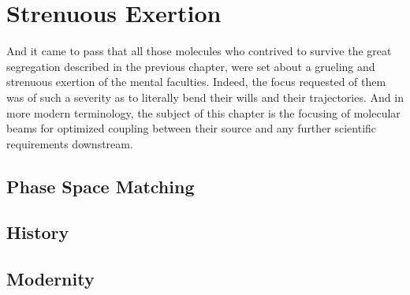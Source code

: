 \chapter{Strenuous Exertion}

And it came to pass that all those molecules who contrived to survive the great segregation described in the previous chapter, were set about a grueling and strenuous exertion of the mental faculties. Indeed, the focus requested of them was of such a severity as to literally bend their wills and their trajectories. And in more modern terminology, the subject of this chapter is the focusing of molecular beams for optimized coupling between their source and any further scientific requirements downstream.

\section{Phase Space Matching}

\section{History}

\section{Modernity}